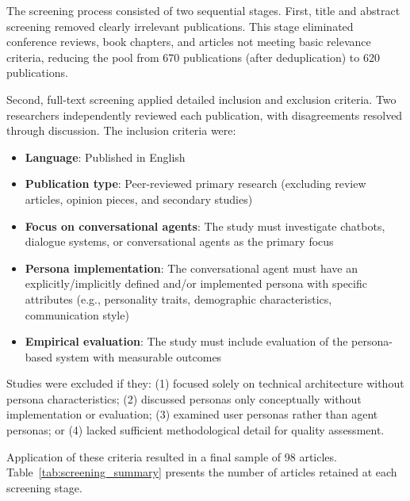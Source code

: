 \documentclass{article}
\begin{document}
The screening process consisted of two sequential stages. First, title and abstract screening removed clearly irrelevant publications. This stage eliminated conference reviews, book chapters, and articles not meeting basic relevance criteria, reducing the pool from 670 publications (after deduplication) to 620 publications.

Second, full-text screening applied detailed inclusion and exclusion criteria. Two researchers independently reviewed each publication, with disagreements resolved through discussion. The inclusion criteria were:

\begin{itemize}
    \item \textbf{Language}: Published in English
    \item \textbf{Publication type}: Peer-reviewed primary research (excluding review articles, opinion pieces, and secondary studies)
    \item \textbf{Focus on conversational agents}: The study must investigate chatbots, dialogue systems, or conversational agents as the primary focus
    \item \textbf{Persona implementation}: The conversational agent must have an explicitly/implicitly defined and/or implemented persona with specific attributes (e.g., personality traits, demographic characteristics, communication style)
    \item \textbf{Empirical evaluation}: The study must include evaluation of the persona-based system with measurable outcomes
\end{itemize}

Studies were excluded if they: (1) focused solely on technical architecture without persona characteristics; (2) discussed personas only conceptually without implementation or evaluation; (3) examined user personas rather than agent personas; or (4) lacked sufficient methodological detail for quality assessment.

Application of these criteria resulted in a final sample of 98 articles. Table~\ref{tab:screening_summary} presents the number of articles retained at each screening stage.
\end{document}
